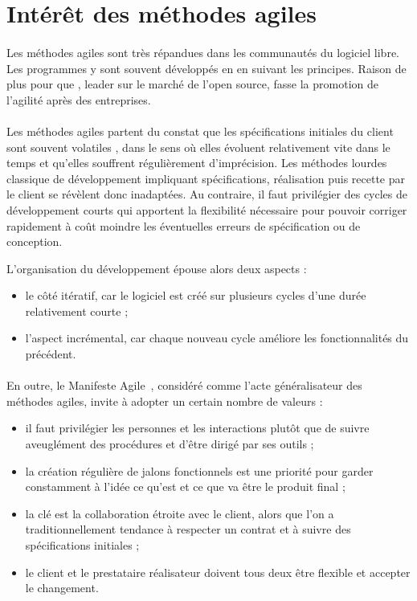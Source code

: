 \section{Intérêt des méthodes agiles}

\paragraph{}
Les méthodes agiles sont très répandues dans les communautés du logiciel libre.
Les programmes y sont souvent développés en en suivant les principes.
Raison de plus pour que \asmile{}, leader sur le marché de l'open source, fasse la promotion de l'agilité après des entreprises.


\paragraph{}
Les méthodes agiles partent du constat que les spécifications initiales du client sont souvent \og volatiles \fg, dans le sens où elles évoluent relativement vite dans le temps et qu'elles souffrent régulièrement d'imprécision.
Les méthodes lourdes classique de développement impliquant spécifications, réalisation puis recette par le client se révèlent donc inadaptées.
Au contraire, il faut privilégier des cycles de développement courts qui apportent la flexibilité nécessaire pour pouvoir corriger rapidement à coût moindre les éventuelles erreurs de spécification ou de conception.

L'organisation du développement épouse alors deux aspects :

\begin{itemize}
	\item le côté itératif, car le logiciel est créé sur plusieurs cycles d'une durée relativement courte ;
	\item l'aspect incrémental, car chaque nouveau cycle améliore les fonctionnalités du précédent.
\end{itemize}


\paragraph{}
En outre, le Manifeste Agile~\cite{agile}, considéré comme l'acte généralisateur des méthodes agiles, invite à adopter un certain nombre de valeurs :

\begin{itemize}
	\item il faut privilégier les personnes et les interactions plutôt que de suivre aveuglément des procédures et d'être dirigé par ses outils ;
	\item la création régulière de jalons fonctionnels est une priorité pour garder cons\-tam\-ment à l'idée ce qu'est et ce que va être le produit final ;
	\item la clé est la collaboration étroite avec le client, alors que l'on a traditionnellement tendance à respecter un contrat et à suivre des spécifications initiales ;
	\item le client et le prestataire réalisateur doivent tous deux être flexible et accepter le changement.
\end{itemize}


